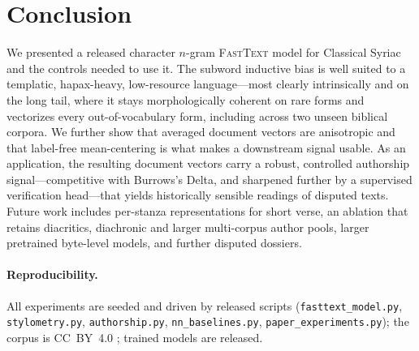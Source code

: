 \documentclass[11pt]{article}
\begin{document}
\section{Conclusion}
\label{sec:conclusion}
We presented a released character $n$-gram \textsc{FastText} model for Classical
Syriac and the controls needed to use it. The subword inductive bias is well
suited to a templatic, hapax-heavy, low-resource language---most clearly
intrinsically and on the long tail, where it stays morphologically coherent on
rare forms and vectorizes every out-of-vocabulary form, including across two
unseen biblical corpora. We further show that averaged document vectors are
anisotropic and that label-free mean-centering is what makes a downstream signal
usable. As an application, the resulting document vectors carry a robust,
controlled authorship signal---competitive with Burrows's Delta, and sharpened
further by a supervised verification head---that yields historically sensible
readings of disputed texts. Future work includes per-stanza representations for
short verse, an ablation that retains diacritics, diachronic and larger
multi-corpus author pools, larger pretrained byte-level models, and further
disputed dossiers.

\paragraph{Reproducibility.}
All experiments are seeded and driven by released scripts
(\texttt{fasttext\_model.py}, \texttt{stylometry.py}, \texttt{authorship.py},
\texttt{nn\_baselines.py}, \texttt{paper\_experiments.py}); the corpus is
CC~BY~4.0 \cite{digitalsyriaccorpus}; trained models are released.



\end{document}
